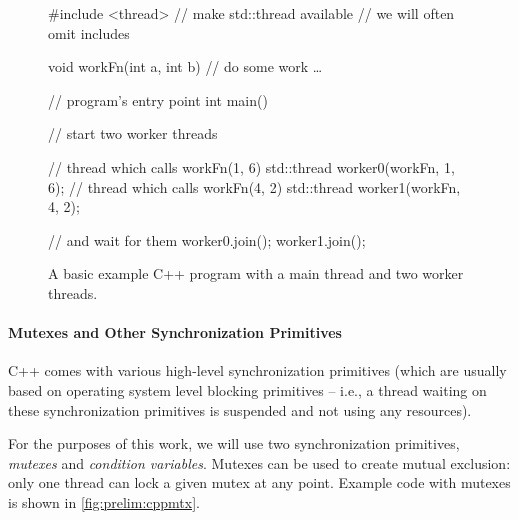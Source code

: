 \begin{figure}[tp]
    \begin{cppcode}
        #include <thread> // make std::thread available
                          // we will often omit includes

        void workFn(int a, int b) {
            // do some work …
        }

        // program's entry point
        int main() {
            // start two worker threads

            // thread which calls workFn(1, 6)
            std::thread worker0(workFn, 1, 6);
            // thread which calls workFn(4, 2)
            std::thread worker1(workFn, 4, 2);

            // and wait for them
            worker0.join();
            worker1.join();
        }
    \end{cppcode}
    \caption{A basic example C++ program with a main thread and two worker
    threads.}\label{fig:prelim:cppthread}
\end{figure}

\paragraph{Mutexes and Other Synchronization Primitives}

C++ comes with various high-level synchronization primitives (which are usually
based on operating system level blocking primitives -- i.e., a thread waiting
on these synchronization primitives is suspended and not using any resources).

For the purposes of this work, we will use two synchronization primitives,
\emph{mutexes} and \emph{condition variables}.
Mutexes can be used to create mutual exclusion: only one thread can lock a
given mutex at any point.
Example code with mutexes is shown in \autoref{fig:prelim:cppmtx}.


